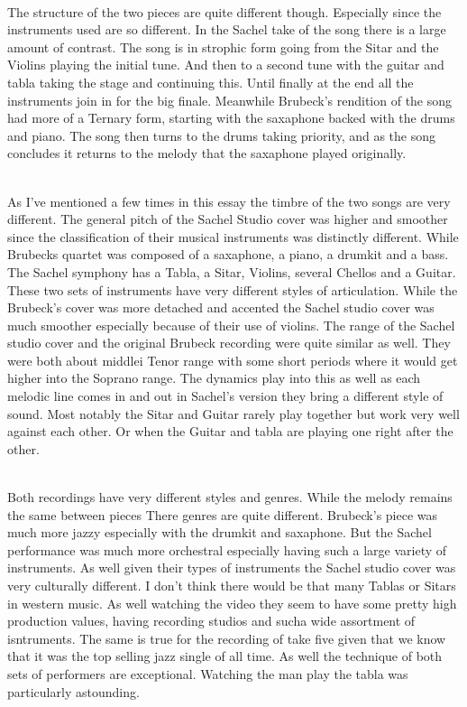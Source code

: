 \documentclass{article}
\begin{document}
\\%
The structure of the two pieces are quite different though. Especially since the
instruments used are so different. In the Sachel take of the song there is a
large amount of contrast. The song is in strophic form going from the Sitar and
the Violins playing the initial tune. And then to a second tune with the guitar
and tabla taking the stage and continuing this. Until finally at the end all the
instruments join in for the big finale. Meanwhile Brubeck's rendition of the
song had more of a Ternary form, starting with the saxaphone backed with the
drums and piano. The song then turns to the drums taking priority, and as the
song concludes it returns to the melody that the saxaphone played originally. 

\\%
As I've mentioned a few times in this essay the timbre of the two songs are very
different. The general pitch of the Sachel Studio cover was higher and smoother
since the classification of their musical instruments was distinctly different.
While Brubecks quartet was composed of a saxaphone, a piano, a drumkit and a
bass. The Sachel symphony has a Tabla, a Sitar, Violins, several Chellos and a
Guitar. These two sets of instruments have very different styles of
articulation. While the Brubeck's cover was more detached and accented the
Sachel studio cover was much smoother especially because of their use of
violins. The range of the Sachel studio cover and the original Brubeck recording
were quite similar as well. They were both about middlei Tenor range with some 
short periods where it would get higher into the Soprano range. The dynamics 
play into this as well as each melodic line comes in and out in Sachel's version
they bring a different style of sound. Most notably the Sitar and Guitar rarely
play together but work very well against each other. Or when the Guitar and
tabla are playing one right after the other.

\\%
Both recordings have very different styles and genres. While the melody remains
the same between pieces There genres are quite different. Brubeck's piece was
much more jazzy especially with the drumkit and saxaphone. But the Sachel
performance was much more orchestral especially having such a large variety of
instruments. As well given their types of instruments the Sachel studio cover
was very culturally different. I don't think there would be that many Tablas or
Sitars in western music. As well watching the video they seem to have some
pretty high production values, having recording studios and sucha wide
assortment of isntruments. The same is true for the recording of take five given
that we know that it was the top selling jazz single of all time. As well the
technique of both sets of performers are exceptional. Watching the man play the
tabla was particularly astounding.
\end{document}
